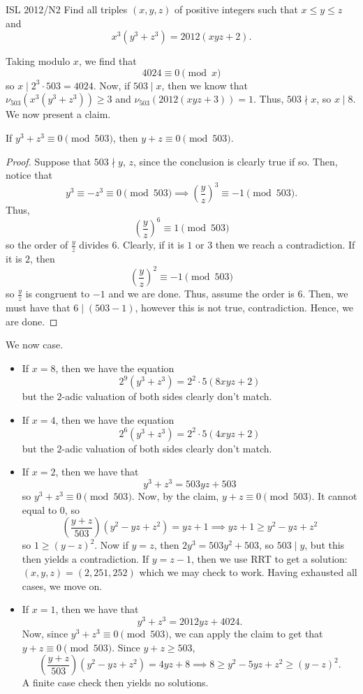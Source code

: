 \documentclass{article}
\begin{document}
\begin{problem}[4.9.14]{ISL 2012/N2}
Find all triples $(x, y, z)$ of positive integers such that $x \le y \le z$ and \[x^3(y^3+z^3) = 2012(xyz+2).\]
\end{problem}

Taking modulo $x$, we find that \[4024 \equiv 0 \pmod{x}\] so $x \mid 2^3 \cdot 503 = 4024$. Now, if $503 \mid x$, then we know that $\nu_{503}(x^3(y^3+z^3)) \ge 3$ and $\nu_{503}(2012(xyz+3)) = 1$. Thus, $503 \nmid x$, so $x \mid 8$. We now present a claim.

\begin{claim*}
If $y^3+z^3 \equiv 0 \pmod{503}$, then $y+z \equiv 0 \pmod{503}$.
\end{claim*}
\begin{proof}
Suppose that $503 \nmid y$, $z$, since the conclusion is clearly true if so. Then, notice that \[y^3 \equiv -z^3 \equiv 0 \pmod{503} \implies \left(\dfrac{y}{z}\right)^3 \equiv -1 \pmod{503}.\] Thus, \[\left(\dfrac{y}{z}\right)^6 \equiv 1 \pmod{503}\] so the order of $\tfrac{y}{z}$ divides $6$. Clearly, if it is $1$ or $3$ then we reach a contradiction. If it is $2$, then \[\left(\dfrac{y}{z}\right)^2 \equiv -1 \pmod{503}\] so $\tfrac{y}{z}$ is congruent to $-1$ and we are done. Thus, assume the order is $6$. Then, we must have that $6 \mid (503-1)$, however this is not true, contradiction. Hence, we are done.
\end{proof}

We now case.

\begin{itemize}
\item If $x = 8$, then we have the equation \[2^9(y^3+z^3) = 2^2\cdot 5(8xyz+2)\] but the $2$-adic valuation of both sides clearly don't match.
\item If $x = 4$, then we have the equation \[2^6(y^3+z^3) = 2^2\cdot 5(4xyz+2)\] but the $2$-adic valuation of both sides clearly don't match.
\item If $x = 2$, then we have that \[y^3+z^3 = 503yz+503\] so $y^3+z^3 \equiv 0 \pmod{503}$. Now, by the claim, $y+z \equiv 0 \pmod{503}$. It cannot equal to $0$, so \[\left(\dfrac{y+z}{503}\right)(y^2-yz+z^2) = yz+1 \implies yz+1 \ge y^2-yz+z^2\] so $1 \ge (y-z)^2$. Now if $y = z$, then $2y^3 = 503y^2+503$, so $503 \mid y$, but this then yields a contradiction. If $y = z-1$, then we use RRT to get a solution: $(x, y, z) = \boxed{(2, 251, 252)}$ which we may check to work. Having exhausted all cases, we move on.
\item If $x = 1$, then we have that \[y^3+z^3 = 2012yz+4024.\] Now, since $y^3+z^3 \equiv 0 \pmod{503}$, we can apply the claim to get that $y+z \equiv 0 \pmod{503}$. Since $y+z \ge 503$, \[\left(\dfrac{y+z}{503}\right)(y^2-yz+z^2) = 4yz+8 \implies 8 \ge y^2-5yz+z^2 \ge (y-z)^2.\] A finite case check then yields no solutions.
\end{itemize}
\end{document}
